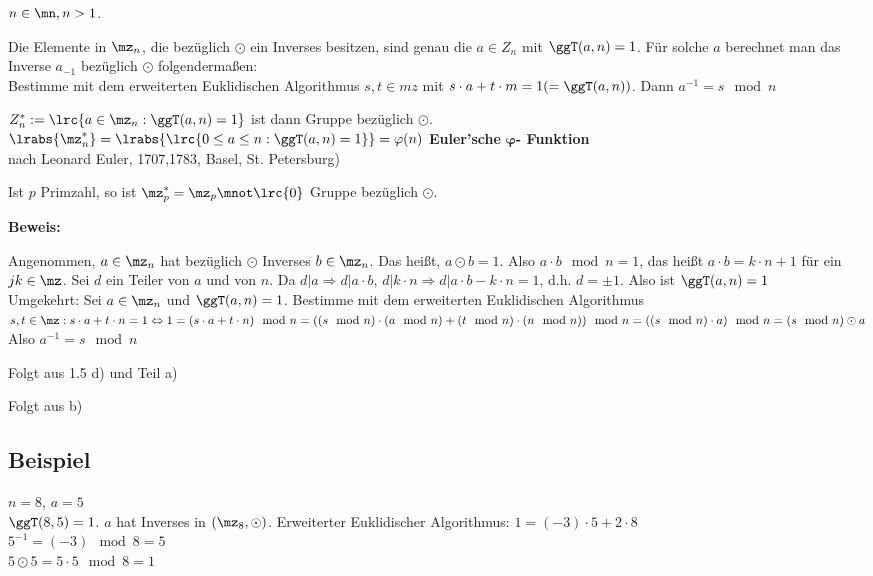 	$n\in\mn,n>1$.
		\item Die Elemente in $\mz_n$, die bezüglich $\odot$ ein Inverses besitzen, sind genau die $a\in Z_n$ mit $\ggT(a,n)=1$. Für solche $a$ berechnet man das Inverse $a_{-1}$ bezüglich $\odot$ folgendermaßen:\\
		Bestimme mit dem erweiterten Euklidischen Algorithmus $s,t\in mz$ mit $s\cdot a+t\cdot m=1(=\ggT(a,n))$. Dann $a^{-1}=s\mod n$
		
		\item $Z_n^*:=\lrc{a\in\mz_n:\ggT(a,n)=1}$ ist dann Gruppe bezüglich $\odot$.\\
		$\lrabs{\mz_n^*}=\lrabs{\lrc{0\leq a\leq n:\ggT(a,n)=1}}=\varphi(n)$ \textbf{Euler'sche} $\mathbf{\varphi}$\textbf{- Funktion}\\ nach Leonard Euler, 1707,1783, Basel, St. Petersburg)
		
		\item Ist $p$ Primzahl, so ist $\mz_p^*=\mz_p\mnot\lrc{0}$ Gruppe bezüglich $\odot$.
	\subExEnd
	
	\textbf{Beweis:}
		\item Angenommen, $a\in\mz_n$ hat bezüglich $\odot$ Inverses $b\in\mz_n$. Das heißt, $a\odot b=1$. Also $a\cdot b\mod n=1$, das heißt $a\cdot b=k\cdot n+1$ für ein $jk\in\mz$. Sei $d$ ein Teiler von $a$ und von $n$. Da $d|a\Rightarrow d|a\cdot b$, $d|k\cdot n\Rightarrow d|a\cdot b-k\cdot n=1$, d.h. $d=\pm 1$. Also ist $\ggT(a,n)=1$\\
		Umgekehrt: Sei $a\in\mz_n$ und $\ggT(a,n)=1$. Bestimme mit dem erweiterten Euklidischen Algorithmus $s,t\in\mz:s\cdot a+t\cdot n=1\Leftrightarrow 1=(s\cdot a+t\cdot n)\mod n=((s\mod n)\cdot(a\mod n)+(t\mod n)\cdot(n\mod n))\mod n=((s\mod n)\cdot a)\mod n=(s\mod n)\odot a$\\
		Also $a^{-1}=s\mod n$
		
		\item Folgt aus 1.5 d) und Teil a)
		\item Folgt aus b)
	\subExEnd
	
	\subsection{Beispiel}
	
	$n=8$, $a=5$\\
	$\ggT(8,5)=1$. $a$ hat Inverses in $(\mz_8,\odot)$.
	Erweiterter Euklidischer Algorithmus: $1=(-3)\cdot 5+2\cdot 8$\\
	$5^{-1}=(-3)\mod 8=5$\\
	$5\odot 5=5\cdot 5\mod 8=1$
	
